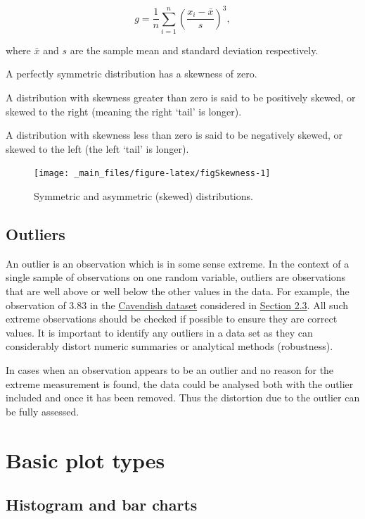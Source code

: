 \documentclass[
]{book}
\begin{document}
\[ g = \frac{1}{n} \sum\limits_{i=1}^n \left( \frac{x_i - {\bar{x}}}{s} \right) ^3 ,\]

where \(\bar{x}\) and \(s\) are the sample mean and standard deviation
respectively.

A perfectly symmetric distribution has a skewness of zero.

A distribution with skewness greater than zero is said to be positively
skewed, or skewed to the right (meaning the right `tail' is longer).

A distribution with skewness less than zero is said to be negatively skewed,
or skewed to the left (the left `tail' is longer).

\begin{figure}
\texttt{[image: \_main\_files/figure-latex/figSkewness-1]} \caption{Symmetric and asymmetric (skewed) distributions.}\label{fig:figSkewness}
\end{figure}

\hypertarget{visual_data-features_outliers}{%
\subsection{\texorpdfstring{{\textbf{Outliers}}}{Outliers}}\label{visual_data-features_outliers}}

An outlier is an observation which is in some sense extreme. In the
context of a single sample of observations on one random variable,
outliers are observations that are well above or well below the other
values in the data. For example, the observation of 3.83 in the \protect\hyperlink{intro_example}{Cavendish dataset} considered in \protect\hyperlink{summary_robust}{Section 2.3}. All such extreme observations should be checked if
possible to ensure they are correct values. It is important to identify
any outliers in a data set as they can considerably distort numeric
summaries or analytical methods (robustness).

In cases when an observation appears to be an outlier and no reason for
the extreme measurement is found, the data could be analysed both with
the outlier included and once it has been removed. Thus the distortion
due to the outlier can be fully assessed.

\hypertarget{visual_plot}{%
\section{Basic plot types}\label{visual_plot}}

\hypertarget{visual_plot_histo}{%
\subsection{\texorpdfstring{{\textbf{Histogram and bar charts}}}{Histogram and bar charts}}\label{visual_plot_histo}}
\end{document}
